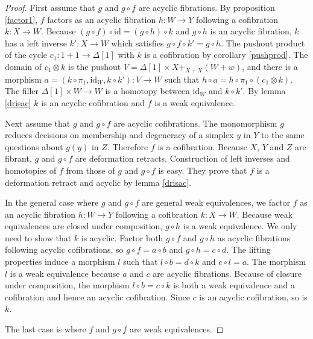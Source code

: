 \documentclass{amsart}
\theoremstyle{plain}
\theoremstyle{definition}
\newcommand\id{\mathrm{id}}
\begin{document}
\begin{proof}
First assume that $g$ and $g\circ f$ are acyclic fibrations. By proposition \ref{factor1}, $f$ factors as an acyclic fibration $h:W\to Y$ following a cofibration $k:X\to W$. Because $(g\circ f)\circ \id = (g\circ h)\circ k$ and $g\circ h$ is an acyclic fibration, $k$ has a left inverse $k':X\to W$ which satisfies $g\circ f\circ k' = g\circ h$. The pushout product of the cycle $c_1:1+1\to \Delta[1]$ with $k$ is a cofibration by corollary \ref{pushprod}. The domain of $c_1\otimes k$ is the pushout $V=\Delta[1]\times X+_{X+X}(W+w)$, and there is a morphism $a=(k\circ \pi_1,\id_W,k\circ k'):V\to W$ such that $h\circ a = h\circ \pi_1\circ (c_1\otimes k)$. The filler $\Delta[1]\times W\to W$ is a homotopy between $\id_W$ and $k\circ k'$. By lemma \ref{drisac} $k$ is an acyclic cofibration and $f$ is a weak equivalence.

Next assume that $g$ and $g\circ f$ are acyclic cofibrations. The monomorphism $g$ reduces decisions on membership and degeneracy of a simplex $y$ in $Y$ to the same questions about $g(y)$ in $Z$. Therefore $f$ is a cofibration. Because $X$, $Y$ and $Z$ are fibrant, $g$ and $g\circ f$ are deformation retracts. Construction of left inverses and homotopies of $f$ from those of $g$ and $g\circ f$ is easy. They prove that $f$ is a deformation retract and acyclic by lemma \ref{drisac}.


In the general case where $g$ and $g\circ f$ are general weak equivalences, we factor $f$ as an acyclic fibration $h:W\to Y$ following a cofibration $k:X\to W$. Because weak equivalences are closed under composition, $g\circ h$ is a weak equivalence. We only need to show that $k$ is acyclic. Factor both $g\circ f$ and $g\circ h$ as acyclic fibrations following acyclic cofibrations, so $g\circ f = a\circ b$ and $g\circ h = c\circ d$. The lifting properties induce a morphism $l$ such that $l\circ b = d\circ k$ and $c\circ l = a$. The morphism $l$ is a weak equivalence because $a$ and $c$ are acyclic fibrations. Because of closure under composition, the morphism $l\circ b = c\circ k$ is both a weak equivalence and a cofibration and hence an acyclic cofibration. Since $c$ is an acyclic cofibration, so is $k$.

The last case is where $f$ and $g\circ f$ are weak equivalences.


\end{proof}
\end{document}
